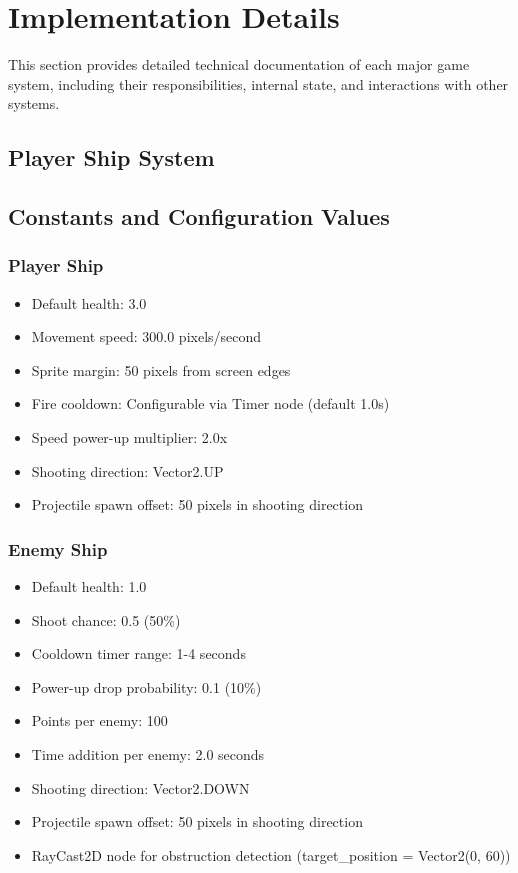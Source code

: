 \documentclass{article}
\begin{document}
\section{Implementation Details}

This section provides detailed technical documentation of each major game system, including their responsibilities, internal state, and interactions with other systems.

\subsection{Player Ship System}

\subsection{Constants and Configuration Values}

\subsubsection{Player Ship}
\begin{itemize}
    \item Default health: 3.0
    \item Movement speed: 300.0 pixels/second
    \item Sprite margin: 50 pixels from screen edges
    \item Fire cooldown: Configurable via Timer node (default 1.0s)
    \item Speed power-up multiplier: 2.0x
    \item Shooting direction: Vector2.UP
    \item Projectile spawn offset: 50 pixels in shooting direction
\end{itemize}

\subsubsection{Enemy Ship}
\begin{itemize}
    \item Default health: 1.0
    \item Shoot chance: 0.5 (50\%)
    \item Cooldown timer range: 1-4 seconds
    \item Power-up drop probability: 0.1 (10\%)
    \item Points per enemy: 100
    \item Time addition per enemy: 2.0 seconds
    \item Shooting direction: Vector2.DOWN
    \item Projectile spawn offset: 50 pixels in shooting direction
    \item RayCast2D node for obstruction detection (target\_position = Vector2(0, 60))
\end{itemize}
\end{document}
